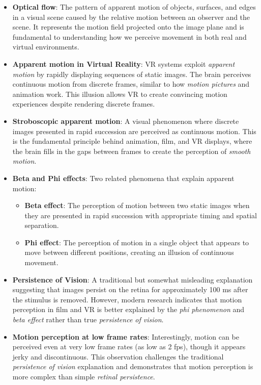\documentclass[11pt,a4paper]{article}
\theoremstyle{definition}
\theoremstyle{plain}
\theoremstyle{remark}
\begin{document}
\begin{itemize}
    \item \textbf{Optical flow}: The pattern of apparent motion of objects, surfaces, and edges in a visual scene caused by the relative motion between an observer and the scene. It represents the motion field projected onto the image plane and is fundamental to understanding how we perceive movement in both real and virtual environments.
    
    \item \textbf{Apparent motion in Virtual Reality}: VR systems exploit \textit{apparent motion} by rapidly displaying sequences of static images. The brain perceives continuous motion from discrete frames, similar to how \textit{motion pictures} and animation work. This illusion allows VR to create convincing motion experiences despite rendering discrete frames.
    
    \item \textbf{Stroboscopic apparent motion}: A visual phenomenon where discrete images presented in rapid succession are perceived as continuous motion. This is the fundamental principle behind animation, film, and VR displays, where the brain fills in the gaps between frames to create the perception of \textit{smooth motion}.
    
    \item \textbf{Beta and Phi effects}: Two related phenomena that explain apparent motion:
    \begin{itemize}
        \item \textbf{Beta effect}: The perception of motion between two static images when they are presented in rapid succession with appropriate timing and spatial separation.
        \item \textbf{Phi effect}: The perception of motion in a single object that appears to move between different positions, creating an illusion of continuous movement.
    \end{itemize}
    
    \item \textbf{Persistence of Vision}: A traditional but somewhat misleading explanation suggesting that images persist on the retina for approximately 100 ms after the stimulus is removed. However, modern research indicates that motion perception in film and VR is better explained by the \textit{phi phenomenon} and \textit{beta effect} rather than true \textit{persistence of vision}.
    
    \item \textbf{Motion perception at low frame rates}: Interestingly, motion can be perceived even at very low frame rates (as low as 2 fps), though it appears jerky and discontinuous. This observation challenges the traditional \textit{persistence of vision} explanation and demonstrates that motion perception is more complex than simple \textit{retinal persistence}.
\end{itemize}
\end{document}
